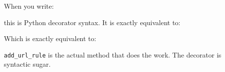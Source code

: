 When you write:

\begin{codebox}[short]

\begin{Shaded}
\begin{Highlighting}[]
\NormalTok{(}\OperatorTok{=}\NormalTok{[}\NormalTok{])}
\end{Highlighting}
\end{Shaded}

\end{codebox}

\noindent{}this is Python decorator syntax. It is exactly equivalent to:

\begin{codebox}[short]

\begin{Shaded}
\begin{Highlighting}[]

\OperatorTok{=}\NormalTok{[}\NormalTok{])(list\_notes)}
\end{Highlighting}
\end{Shaded}

\end{codebox}

\noindent{}Which is exactly equivalent to:

\begin{codebox}[short]

\begin{Shaded}
\begin{Highlighting}[]

\OperatorTok{=}\OperatorTok{=}\OperatorTok{=}\NormalTok{[}\NormalTok{])}
\end{Highlighting}
\end{Shaded}

\end{codebox}

\noindent{}\texttt{add\_url\_rule} is the actual method that does the work. The decorator is syntactic sugar.

